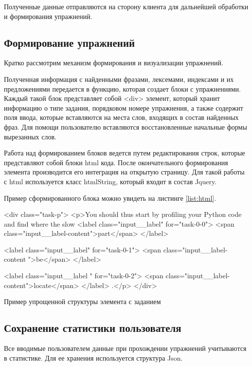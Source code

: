 Полученные данные отправляются на сторону клиента для дальнейшей обработки и формирования упражнений.
\newpage
\subsection{Формирование упражнений}
Кратко рассмотрим механизм формирования и визуализации упражнений.

Полученная информация с найденными фразами, лексемами, индексами и их предложениями передается в функцию, которая создает блоки с упражнениями. Каждый такой блок представляет собой <div> элемент, который хранит информацию о типе задания, порядковом номере упражнения, а также содержит поля ввода, которые вставляются на места слов, входящих в состав найденных фраз. Для помощи пользователю вставляются восстановленные начальные формы вырезанных слов.

Работа над формированием блоков ведется путем редактирования строк, которые представляют собой блоки html кода. После окончательного формирования элемента производится его интеграция на открытую страницу. Для такой работы с html используется класс htmlString, который входит в состав Jquery.

Пример сформированного блока можно увидеть на листинге \ref{list:html}.

\begin{ListingEnv}[h]
\begin{Verb}
<div class="task-p">
<p>You should thus start by profiling your Python code and find
 where the slow
    <label class="input__label" for="task-0-0">
        <span class="input__label-content">part</span>
    </label>
    
    <label class="input__label" for="task-0-1">
        <span class="input__label-content ">be</span>
    </label>

    <label class="input__label " for="task-0-2">
        <span class="input__label-content">locate</span>
    </label>
.</p> 
</div>
\end{Verb}
\caption{Пример упрощенной структуры элемента с заданием}
\label{list:html}
\end{ListingEnv}
\subsection{Сохранение статистики пользователя}
Все вводимые пользователем данные при прохождении упражнений учитываются в статистике. Для ее хранения используется структура Json.  

